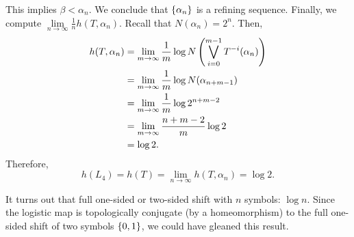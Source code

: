 \documentclass[12pt,twoside,draft]{book}
\begin{document}
This implies $\beta < \alpha_n$.
We conclude that $\left \{ \alpha_n \right \}$ is a refining sequence.
Finally, we compute $\lim\limits_{n \to \infty} \frac{1}{n} h(T, \alpha_n)$.
Recall that $N(\alpha_{n}) = 2^n$.
Then,
\begin{align*}
  h(T, \alpha_n)
  &= \lim\limits_{m \to \infty} \frac{1}{m} \log N\left (  \bigvee\limits_{i = 0}^{m-1} T^{-i}(\alpha_n) \right )  \\
  &= \lim\limits_{m \to \infty} \frac{1}{m} \log N(\alpha_{n+m-1})  \\
  &= \lim\limits_{m \to \infty} \frac{1}{m} \log 2^{n + m - 2}  \\
  &= \lim\limits_{m \to \infty} \frac{n + m - 2}{m} \log 2 \\
  &= \log 2.
\end{align*}
Therefore,
\begin{equation*}
  h(L_4) = h(T) = \lim\limits_{n \to \infty} h(T, \alpha_n) = \log 2.
\end{equation*}

It turns out that full one-sided or two-sided shift with $n$ symbols: $\log n$. \citep[p.177]{walters}
Since the logistic map is topologically conjugate (by a homeomorphism) to the full one-sided shift of two symbols $\left \{ 0,1 \right \}$, we could have gleaned this result.




\printindex
\end{document}
